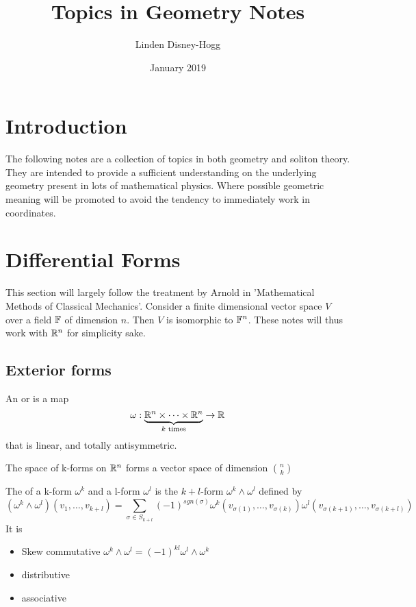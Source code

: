 \documentclass{article}
\title{Topics in Geometry Notes}
\author{Linden Disney-Hogg}
\date{January 2019}
\begin{document}
\maketitle
\tableofcontents

\section{Introduction}
The following notes are a collection of topics in both geometry and soliton theory. They are intended to provide a sufficient understanding on the underlying geometry present in lots of mathematical physics. Where possible geometric meaning will be promoted to avoid the tendency to immediately work in coordinates.

\section{Differential Forms}
This section will largely follow the treatment by Arnold in 'Mathematical Methods of Classical Mechanics'. Consider a finite dimensional vector space $V$ over a field $\mathbb{F}$ of dimension $n$. Then $V$ is isomorphic to $\mathbb{F}^n$. These notes will thus work with $\mathbb{R}^n$ for simplicity sake. 

\subsection{Exterior forms}

\begin{definition}[k-form]
An  or  is a map 
\[
\omega : \underbrace{\mathbb{R}^n \times \dots \times \mathbb{R}^n}_{k\text{ times}} \to \mathbb{R}
\]
that is linear, and totally antisymmetric.
\end{definition}

\begin{theorem}
The space of k-forms on $\mathbb{R}^n$ forms a vector space of dimension $\binom{n}{k}$
\end{theorem}

\begin{definition}
The  of a k-form $\omega^k$ and a l-form $\omega^l$ is the $k+l$-form $\omega^k \wedge \omega^l$ defined by 
\[
(\omega^k\wedge\omega^l)(v_1,\dots,v_{k+l}) = \sum_{\sigma \in S_{k+l}} (-1)^{sgn(\sigma)} \omega^k(v_{\sigma(1)},\dots,v_{\sigma(k)}) \omega^l(v_{\sigma(k+1)},\dots,v_{\sigma(k+l)})
\]
It is 
\begin{itemize}
    \item Skew commutative $\omega^k \wedge \omega^l = (-1)^{kl} \omega^l \wedge \omega^k$
    \item distributive
    \item associative 
\end{itemize}
\end{definition}
\end{document}
